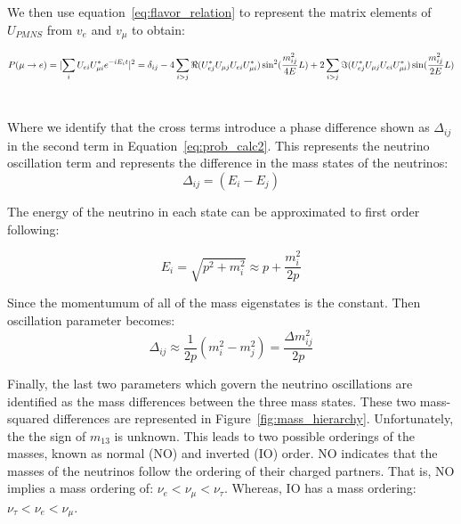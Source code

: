We then use equation~\ref{eq:flavor_relation} to represent the matrix elements of $U_{PMNS}$ from $v_{e}$ and $v_{\mu}$  to obtain:

\begin{equation}
  P(\mu \rightarrow e)
  = \lvert \sum_{i} U_{e i} U^{*}_{\mu i} e^{-i E_{i}t} \rvert^{2} \\
  =
  \delta_{ij}
  - 4 \sum_{i>j}  \Re( U^{*}_{ej}U_{\mu j}U_{ei}U^{*}_{\mu i} ) \sin ^2(\frac{m_{ij}^{2}}{4E}L)
  + 2 \sum_{i>j}  \Im( U^{*}_{ej}U_{\mu j}U_{ei}U^{*}_{\mu i} ) \sin(\frac{m_{ij}^{2}}{2E}L)
\end{equation}~\label{eq:prob_calc2}

Where we identify that the cross terms introduce a phase difference shown as $\Delta_{ij}$ in the second term in Equation~\ref{eq:prob_calc2}.
This represents the neutrino oscillation term and represents the difference in the mass states of the neutrinos:
\begin{equation}
\Delta_{ij} = (E_{i} - E_{j})
\end{equation}

The energy of the neutrino in each state can be approximated to first order following:

\begin{equation}
E_{i} = \sqrt{p^2 + m_{i}^{2}} \approx p + \frac{m^{2}_{i}}{2p}
\end{equation}

Since the momentumum of all of the mass eigenstates is the constant.
Then oscillation parameter becomes:
\begin{equation}
\Delta_{ij} \approx \frac{1}{2p}(m^2_{i}-m^{2}_{j}) = \frac{\Delta m_{ij}^2}{2p}
\end{equation}

Finally, the last two parameters which govern the neutrino oscillations are identified as the mass differences between the three mass states.
These two mass-squared differences are represented in Figure~\ref{fig:mass_hierarchy}.
Unfortunately, the the sign of $m_{13}$ is unknown.
This leads to two possible orderings of the masses, known as normal (NO) and inverted (IO) order.
NO indicates that the masses of the neutrinos follow the ordering of their charged partners.
That is, NO implies a mass ordering of: $\nu_{e} < \nu_{\mu} < \nu_{\tau}$.
Whereas, IO has a mass ordering: $\nu_{\tau} < \nu_{e} < \nu_{\mu}$.

